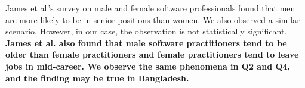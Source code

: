 % 
James et al.'s \citep{James2017} survey on male
and female software professionals found that men are more likely to be in senior
positions than women. We also observed a similar scenario. However, in our case, the observation is not statistically significant. \bf{James et al. \citep{James2017} also found that male software practitioners tend to be older than female practitioners and female practitioners tend to leave jobs in mid-career. We observe the same phenomena in Q2 and Q4, and the finding may be
true in Bangladesh.}


